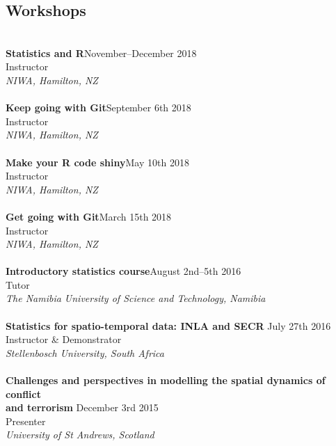 \documentclass[10pt,letter]{article}
\begin{document}
 \newpage

\subsection*{Workshops}
\vspace{1mm}
 \hdashrule[0.5ex]{4cm}{1pt}{1pt}\\
{\textbf{Statistics and R}}\hfill November--December 2018\\
Instructor \\
 {\sl NIWA, Hamilton, NZ}\\
 \hdashrule[0.5ex]{4cm}{1pt}{1pt}\\
{\textbf{Keep going with Git}}\hfill September 6th 2018\\
Instructor \\
 {\sl NIWA, Hamilton, NZ}\\
 \hdashrule[0.5ex]{4cm}{1pt}{1pt}\\
{\textbf{Make your R code shiny}}\hfill May 10th 2018\\
Instructor \\
 {\sl NIWA, Hamilton, NZ}\\
 \hdashrule[0.5ex]{4cm}{1pt}{1pt}\\
{\textbf{Get going with Git}}\hfill March 15th 2018\\
Instructor \\
 {\sl NIWA, Hamilton, NZ}\\
 \hdashrule[0.5ex]{4cm}{1pt}{1pt}\\
{\textbf{Introductory statistics course}}\hfill August 2nd--5th 2016\\
Tutor \\
 {\sl The Namibia University of Science and Technology, Namibia}\\
 \hdashrule[0.5ex]{4cm}{1pt}{1pt}\\
 {\textbf{{Statistics for spatio-temporal data: INLA and SECR }}} \hfill July 27th 2016\\
 Instructor \& Demonstrator\\
 {\sl Stellenbosch University, South Africa}\\
 \hdashrule[0.5ex]{4cm}{1pt}{1pt}\\
 {\textbf{{Challenges and perspectives in modelling the spatial dynamics of conflict\\ and terrorism }}} \hfill December 3rd 2015\\
 Presenter\\
 {\sl University of St Andrews, Scotland}\\
 \hdashrule[0.5ex]{4cm}{1pt}{1pt}\\
\end{document}
